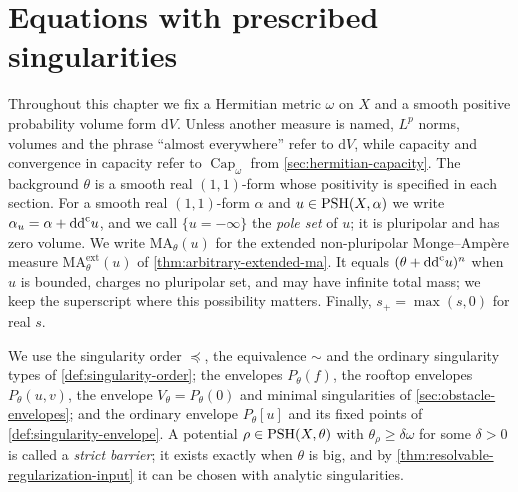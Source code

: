 \chapter{Equations with prescribed singularities}
\label{chap:prescribed-equations}

Throughout this chapter we fix a Hermitian metric $\omega$ on $X$ and a smooth positive probability volume form $\mathrm{d}V$. Unless another measure is named, $L^p$ norms, volumes and the phrase ``almost everywhere'' refer to $\mathrm{d}V$, while capacity and convergence in capacity refer to $\operatorname{Cap}_\omega$ from \cref{sec:hermitian-capacity}. The background $\theta$ is a smooth real $(1,1)$-form whose positivity is specified in each section. For a smooth real $(1,1)$-form $\alpha$ and $u\in\mathrm{PSH}(X,\alpha)$ we write $\alpha_u=\alpha+\mathrm{dd}^{\mathrm{c}} u$, and we call $\{u=-\infty\}$ the \emph{pole set} of $u$; it is pluripolar and has zero volume. We write $\mathrm{MA}_\theta(u)$ for the extended non-pluripolar Monge--Amp\`ere measure $\mathrm{MA}^{\mathrm{ext}}_\theta(u)$ of \cref{thm:arbitrary-extended-ma}. It equals $(\theta+\mathrm{dd}^{\mathrm{c}} u)^n$ when $u$ is bounded, charges no pluripolar set, and may have infinite total mass; we keep the superscript where this possibility matters. Finally, $s_+=\max(s,0)$ for real $s$.

We use the singularity order $\preceq$, the equivalence $\sim$ and the ordinary singularity types of \cref{def:singularity-order}; the envelopes $P_\theta(f)$, the rooftop envelopes $P_\theta(u,v)$, the envelope $V_\theta=P_\theta(0)$ and minimal singularities of \cref{sec:obstacle-envelopes}; and the ordinary envelope $P_\theta[u]$ and its fixed points of \cref{def:singularity-envelope}. A potential $\rho\in\mathrm{PSH}(X,\theta)$ with $\theta_\rho\geq\delta\omega$ for some $\delta>0$ is called a \emph{strict barrier}; it exists exactly when $\theta$ is big, and by \cref{thm:resolvable-regularization-input} it can be chosen with analytic singularities.

